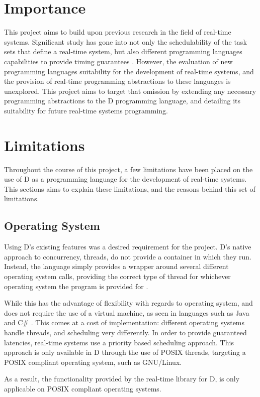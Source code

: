 \section{Importance} %
This project aims to build upon previous research in the field of real-time systems. 
Significant study has gone into not only the schedulability of the task sets that 
define a real-time system, but also different programming languages capabilities 
to provide timing guarantees \cite{burns-sched-analysis,atc-article}. 
However, the evaluation of new programming languages suitability for the 
development of real-time systems, and the provision of real-time programming 
abstractions to these languages is unexplored. This project aims to target that 
omission by extending any necessary programming abstractions to the D programming 
language, and detailing its suitability for future real-time systems programming.
\section{Limitations} %
Throughout the course of this project, a few limitations have been placed on the 
use of D as a programming language for the development of real-time systems. 
This sections aims to explain these limitations, and the reasons behind this set 
of limitations. 
\subsection{Operating System}
Using D's existing features was a desired requirement for the project. D's native 
approach to concurrency, threads, do not provide a container in which they run. 
Instead, the language simply provides a wrapper around several different operating 
system calls, providing the correct type of thread for whichever operating system 
the program is provided for \cite{github-core-thread}. 
\par\bigskip\noindent
While this has the advantage of flexibility with regards to operating system, 
and does not require the use of a virtual machine, as seen in languages such as 
Java and C\# \cite{zhang2007exploiting}. This comes at a cost of implementation: 
different operating systems handle threads, and scheduling very differently. 
In order to provide guaranteed latencies, real-time systems use a priority based 
scheduling approach. This approach is only available in D through the use of 
POSIX threads, targeting a POSIX compliant operating system, such as GNU/Linux. 
\par\bigskip\noindent
As a result, the functionality provided by the real-time library for D, is only 
applicable on POSIX compliant operating systems.

